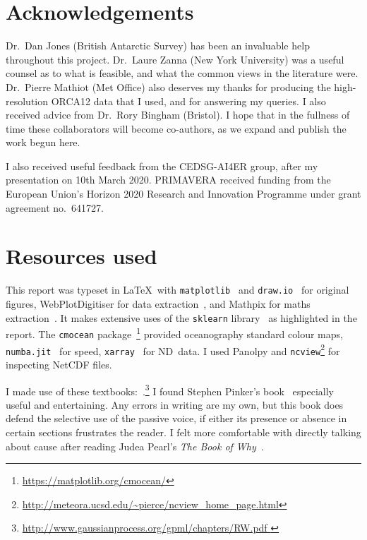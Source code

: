 \section{Acknowledgements}
Dr.\ Dan Jones (British Antarctic Survey)
has been an invaluable help throughout this project.
Dr.\ Laure Zanna (New York University)
 was a useful counsel as to what is feasible,
 and what the common views in the literature were.
Dr.\ Pierre Mathiot (Met Office) also deserves my thanks for
producing the high-resolution ORCA12 data that I used, and
for answering my queries.
I also received advice from Dr.\ Rory Bingham (Bristol).
I hope that in the fullness of time these collaborators will become
co-authors, as we expand and publish the work begun here.

I also received useful feedback from the CEDSG-AI4ER group,
after my presentation on 10th March 2020.
PRIMAVERA received funding from the European Union's Horizon 2020
Research and Innovation Programme under grant agreement no.~641727.


\section{Resources used}

This report was typeset in \LaTeX\
with \texttt{matplotlib}~\cite{Hunter:2007} and \texttt{draw.io}~\cite{DrawIO}
for original figures, WebPlotDigitiser for data extraction~\cite{WebPlotDigitiser},
and Mathpix for maths extraction~\cite{mathpix}.
It makes extensive uses of the \texttt{sklearn}
library~\cite{scikit-learn} as highlighted in the report.
The \texttt{cmocean} package~\cite{thyng2016true}\footnote{\url{https://matplotlib.org/cmocean/}}
provided oceanography standard colour maps, \texttt{numba.jit}~\cite{lam2015numba} for speed,
\texttt{xarray}~\cite{hoyer2017xarray} for ND~data.
I used Panolpy and \texttt{ncview}\footnote{\url{http://meteora.ucsd.edu/~pierce/ncview_home_page.html}}
for inspecting NetCDF files.

I made use of these textbooks:~\cite{roisin2010GFD,williams2011ocean,ITILA,
sivia2006data,williams2006gaussian,
}.\footnote{\url{http://www.gaussianprocess.org/gpml/chapters/RW.pdf
}}
I found Stephen Pinker's book~\cite{pinker2015sense} especially useful and entertaining.
Any errors in writing are my own, but this book does defend the selective use of the
passive voice, if either its presence or absence in certain sections frustrates the reader.
I felt more comfortable with directly talking about cause after reading
Judea Pearl's \textit{The Book of Why}~\cite{pearl2018book}.

